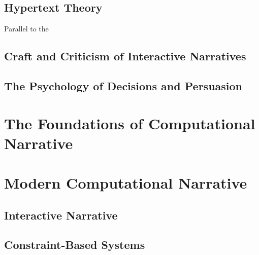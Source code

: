 \subsection{Hypertext Theory}

Parallel to the

\citep{Bernstein1998}
\citep{Morgan1999}
\citep{Tosca1999}
\citep{Tosca2000}

\subsection{Craft and Criticism of Interactive Narratives}

\subsection{The Psychology of Decisions and Persuasion}


\section{The Foundations of Computational Narrative}

\cite{Klein1971, Klein1973}
\cite{Meehan1976}
\cite{Lebowitz1984}


\section{Modern Computational Narrative}


\subsection{Interactive Narrative}

\cite{Laurel1986}


\subsection{Constraint-Based Systems}


